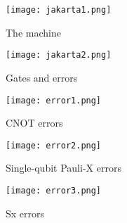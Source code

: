 \begin{figure}
\texttt{[image: jakarta1.png]}
\centering
\caption{The machine}
\label{fig:jakarta1}
\end{figure}

\begin{figure}
\texttt{[image: jakarta2.png]}
\centering
\caption{Gates and errors}
\label{fig:jakarta2}
\end{figure}


\begin{figure}
\texttt{[image: error1.png]}
\centering
\caption{CNOT errors}
\label{fig:cnot-error}
\end{figure}


\begin{figure}
\texttt{[image: error2.png]}
\centering
\caption{Single-qubit Pauli-X errors}
\label{fig:pauli-error}
\end{figure}

\begin{figure}
\texttt{[image: error3.png]}
\centering
\caption{Sx errors}
\label{fig:sx-error}
\end{figure}
